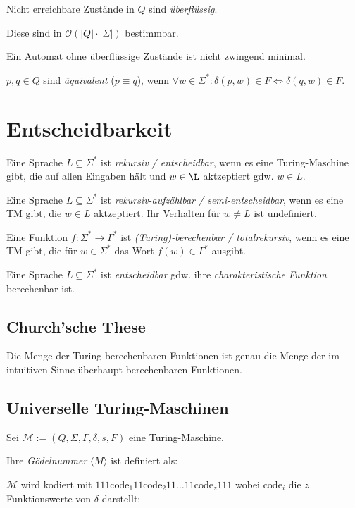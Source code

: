 Nicht erreichbare Zustände in $Q$ sind \emph{überflüssig}.

Diese sind in $\mathcal{O}(|Q|\cdot|\Sigma|)$ bestimmbar.

Ein Automat ohne überflüssige Zustände ist nicht zwingend minimal.

$p, q \in Q$ sind \emph{äquivalent} ($p \equiv q$), wenn $\forall w \in \Sigma^* : \delta(p,w) \in F \iff \delta(q,w) \in F$.

\section*{Entscheidbarkeit}

Eine Sprache $L \subseteq \Sigma^*$ ist \emph{rekursiv / entscheidbar}, wenn es eine Turing-Maschine gibt, die auf allen Eingaben hält und $w \in \L$ aktzeptiert gdw. $w \in L$.

\spacing

Eine Sprache $L \subseteq \Sigma^*$ ist \emph{rekursiv-aufzählbar / semi-entscheidbar}, wenn es eine TM gibt, die $w \in L$ aktzeptiert. Ihr Verhalten für $w \neq L$ ist undefiniert.

\spacing

Eine Funktion $f : \Sigma^* \to \Gamma^*$ ist \emph{(Turing)-berechenbar / totalrekursiv}, wenn es eine TM gibt, die für $w \in \Sigma^*$ das Wort $f(w) \in \Gamma^*$ ausgibt.

\spacing

Eine Sprache $L \subseteq \Sigma^*$ ist \emph{entscheidbar} gdw. ihre \emph{charakteristische Funktion} berechenbar ist.

\subsection*{Church'sche These}

Die Menge der Turing-berechenbaren Funktionen ist genau die Menge der im intuitiven Sinne überhaupt berechenbaren Funktionen.

\subsection*{Universelle Turing-Maschinen}

Sei $\mathcal{M} := (Q,\Sigma,\Gamma,\delta,s,F)$ eine Turing-Maschine.

Ihre \emph{Gödelnummer} $\langle M \rangle$ ist definiert als:

\spacing

$\mathcal{M}$ wird kodiert mit $111\text{code}_1 11\text{code}_2 11 \dots 11\text{code}_z 111$ wobei $\text{code}_i$ die $z$ Funktionswerte von $\delta$ darstellt:

